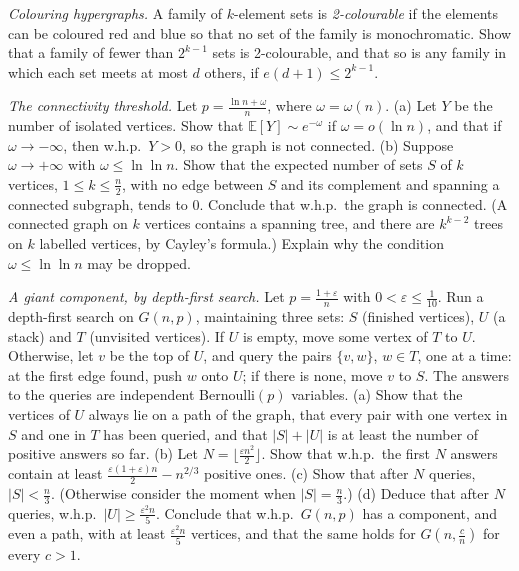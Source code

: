 \begin{exercise}[$\star$]\label{ex:propertyb}
\emph{Colouring hypergraphs.} A family of $k$-element sets is \emph{2-colourable} if the elements can be coloured red and blue so that no set
of the family is monochromatic. Show that a family of fewer than $2^{k-1}$ sets is 2-colourable, and that so is any family in which each
set meets at most $d$ others, if $e(d+1)\le2^{k-1}$.
\end{exercise}

\begin{exercise}[$\star\star\star$]\label{ex:connectivity}
\emph{The connectivity threshold.} Let $p=\frac{\ln n+\omega}n$, where $\omega=\omega(n)$.
(a) Let $Y$ be the number of isolated vertices. Show that $\mathbb E[Y]\sim e^{-\omega}$ if $\omega=o(\ln n)$, and that if $\omega\to-\infty$, then w.h.p.\ $Y>0$, so the graph is not connected.
(b) Suppose $\omega\to+\infty$ with $\omega\le\ln\ln n$. Show that the expected number of sets $S$ of $k$ vertices, $1\le k\le\frac n2$, with no edge between $S$ and its complement
and spanning a connected subgraph, tends to $0$. Conclude that w.h.p.\ the graph is connected. (A connected graph on $k$ vertices contains a
spanning tree, and there are $k^{k-2}$ trees on $k$ labelled vertices, by Cayley's formula.) Explain why the condition $\omega\le\ln\ln n$ may be dropped.
\end{exercise}

\begin{exercise}[$\star\star\star$]\label{ex:giant}
\emph{A giant component, by depth-first search.} Let $p=\frac{1+\varepsilon}n$ with $0<\varepsilon\le\frac1{10}$. Run a depth-first search on $G(n,p)$, maintaining three sets: $S$
(finished vertices), $U$ (a stack) and $T$ (unvisited vertices). If $U$ is empty, move some vertex of $T$ to $U$. Otherwise, let $v$ be the top of
$U$, and query the pairs $\{v,w\}$, $w\in T$, one at a time: at the first edge found, push $w$ onto $U$; if there is none, move $v$ to $S$. The answers to
the queries are independent Bernoulli$(p)$ variables.
(a) Show that the vertices of $U$ always lie on a path of the graph, that every pair with one vertex in $S$ and one in $T$ has been
queried, and that $|S|+|U|$ is at least the number of positive answers so far.
(b) Let $N=\lfloor\frac{\varepsilon n^2}2\rfloor$. Show that w.h.p.\ the first $N$ answers contain at least $\frac{\varepsilon(1+\varepsilon)n}2-n^{2/3}$ positive ones.
(c) Show that after $N$ queries, $|S|<\frac n3$. (Otherwise consider the moment when $|S|=\frac n3$.)
(d) Deduce that after $N$ queries, w.h.p.\ $|U|\ge\frac{\varepsilon^2n}5$. Conclude that w.h.p.\ $G(n,p)$ has a component, and even a path, with at least $\frac{\varepsilon^2n}5$ vertices,
and that the same holds for $G(n,\frac cn)$ for every $c>1$.
\end{exercise}

